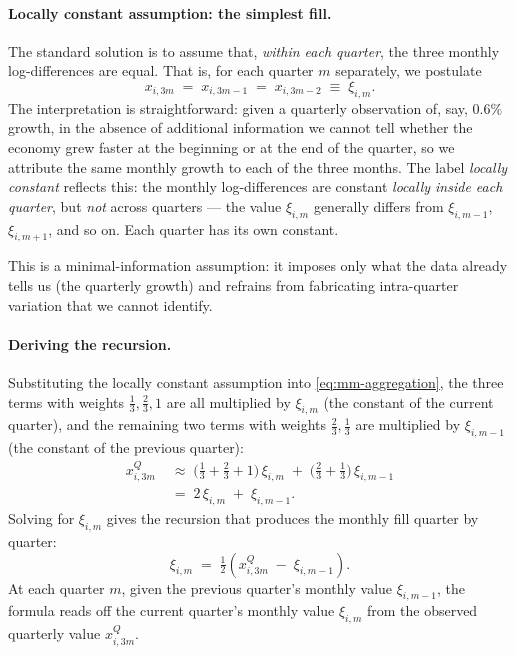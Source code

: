 \documentclass[11pt, a4paper, oneside]{article}
\begin{document}
\paragraph{Locally constant assumption: the simplest fill.}
The standard solution is to assume that, \emph{within each quarter},
the three monthly log-differences are equal. That is, for each
quarter $m$ separately, we postulate
\[
x_{i, 3m} \;=\; x_{i, 3m-1} \;=\; x_{i, 3m-2} \;\equiv\; \xi_{i, m}.
\]
The interpretation is straightforward: given a quarterly observation
of, say, $0.6\%$ growth, in the absence of additional information we
cannot tell whether the economy grew faster at the beginning or at
the end of the quarter, so we attribute the same monthly growth to
each of the three months. The label \emph{locally constant} reflects
this: the monthly log-differences are constant \emph{locally inside
each quarter}, but \emph{not} across quarters — the value $\xi_{i, m}$
generally differs from $\xi_{i, m-1}$, $\xi_{i, m+1}$, and so on.
Each quarter has its own constant.

This is a minimal-information assumption: it imposes only what the
data already tells us (the quarterly growth) and refrains from
fabricating intra-quarter variation that we cannot identify.

\paragraph{Deriving the recursion.}
Substituting the locally constant assumption into
\eqref{eq:mm-aggregation}, the three terms with weights
$\tfrac{1}{3}, \tfrac{2}{3}, 1$ are all multiplied by $\xi_{i, m}$
(the constant of the current quarter), and the remaining two terms
with weights $\tfrac{2}{3}, \tfrac{1}{3}$ are multiplied by
$\xi_{i, m-1}$ (the constant of the previous quarter):
\begin{align*}
x^Q_{i, 3m}
&\;\approx\; \big(\tfrac{1}{3} + \tfrac{2}{3} + 1\big)\,\xi_{i, m}
   \;+\; \big(\tfrac{2}{3} + \tfrac{1}{3}\big)\,\xi_{i, m-1} \\[3pt]
&\;=\; 2\,\xi_{i, m} \;+\; \xi_{i, m-1}.
\end{align*}
Solving for $\xi_{i, m}$ gives the recursion that produces the
monthly fill quarter by quarter:
\begin{equation}
\xi_{i, m} \;=\; \tfrac{1}{2}\!\left(x^Q_{i, 3m} \;-\; \xi_{i, m-1}\right).
\label{eq:mm-fill-recursion}
\end{equation}
At each quarter $m$, given the previous quarter's monthly value
$\xi_{i, m-1}$, the formula reads off the current quarter's monthly
value $\xi_{i, m}$ from the observed quarterly value $x^Q_{i, 3m}$.
\end{document}
